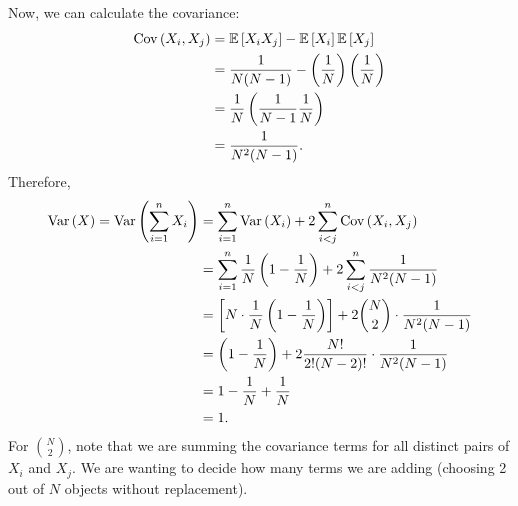 \begin{example}
    Now, we can calculate the covariance:
    \begin{align*}
        \operatorname{Cov}\left({X_i,X_j}\right) &= \mathbb{E}\left[{X_i X_j}\right] - \mathbb{E}\left[{X_i}\right]\mathbb{E}\left[{X_j}\right] \\
        &= \frac{1}{N(N-1)} - \left( \frac{1}{N} \right) \left( \frac{1}{N} \right) \\
        &= \frac{1}{N} \left( \frac{1}{N-1} \frac{1}{N} \right) \\
        &= \frac{1}{N^2 (N-1)}.
    \end{align*}
    Therefore,
    \begin{align*}
        \operatorname{Var}\left({X}\right) = \operatorname{Var}\left({\displaystyle \sum_{i=1}^{n} X_i}\right) &= \displaystyle \sum_{i=1}^{n} \operatorname{Var}\left({X_i}\right) + 2 \displaystyle \sum_{i < j}^{n} \operatorname{Cov}\left({X_i,X_j}\right) \\
        &= \displaystyle \sum_{i=1}^{n} \frac{1}{N} \left( 1 - \frac{1}{N} \right) + 2 \displaystyle \sum_{i<j}^{n} \frac{1}{N^2 (N-1)} \\
        &= \left[ N \cdot \frac{1}{N} \left( 1 - \frac{1}{N} \right) \right] + 2 \binom{N}{2} \cdot \frac{1}{N^2 (N-1)} \\
        &= \left( 1 - \frac{1}{N} \right) + 2 \frac{N!}{2! (N-2)!} \cdot \frac{1}{N^2 (N-1)} \\
        &= 1 - \frac{1}{N} + \frac{1}{N} \\
        &= 1.
    \end{align*}
    For $\binom{N}{2}$, note that we are summing the covariance terms for all distinct pairs of $X_i$ and $X_j$. We are wanting to decide how many terms we are adding (choosing 2 out of $N$ objects without replacement).
\end{example}





\newpage